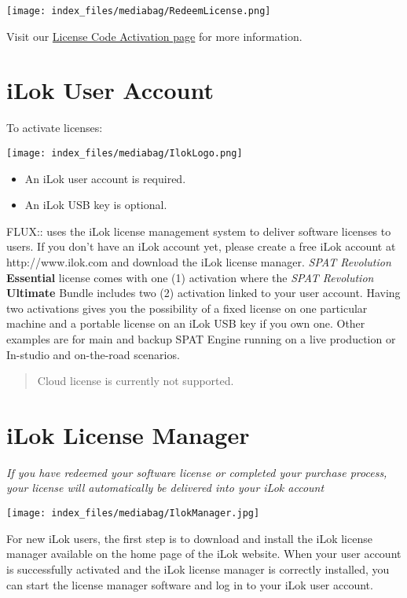 \documentclass[
  letterpaper,
  DIV=11,
  numbers=noendperiod]{scrreport}
\providecommand{\tightlist}{%
  \setlength{\itemsep}{0pt}\setlength{\parskip}{0pt}}\usepackage{longtable,booktabs,array}
\begin{document}
\texttt{[image: index\_files/mediabag/RedeemLicense.png]}

Visit our
\href{https://shop.flux.audio/en_US/account/licence_code_redeem}{License
Code Activation page} for more information.

\hypertarget{ilok-user-account}{%
\section{iLok User Account}\label{ilok-user-account}}

To activate licenses:

\texttt{[image: index\_files/mediabag/IlokLogo.png]}

\begin{itemize}
\tightlist
\item
  An iLok user account is required.
\item
  An iLok USB key is optional.
\end{itemize}

FLUX:: uses the iLok license management system to deliver software
licenses to users. If you don't have an iLok account yet, please create
a free iLok account at http://www.ilok.com and download the iLok license
manager. \emph{SPAT Revolution} \textbf{Essential} license comes with
one (1) activation where the \emph{SPAT Revolution} \textbf{Ultimate}
Bundle includes two (2) activation linked to your user account. Having
two activations gives you the possibility of a fixed license on one
particular machine and a portable license on an iLok USB key if you own
one. Other examples are for main and backup SPAT Engine running on a
live production or In-studio and on-the-road scenarios.

\begin{quote}
Cloud license is currently not supported.
\end{quote}

\hypertarget{ilok-license-manager}{%
\section{iLok License Manager}\label{ilok-license-manager}}

\emph{If you have redeemed your software license or completed your
purchase process, your license will automatically be delivered into your
iLok account}

\texttt{[image: index\_files/mediabag/IlokManager.jpg]}

For new iLok users, the first step is to download and install the iLok
license manager available on the home page of the iLok website. When
your user account is successfully activated and the iLok license manager
is correctly installed, you can start the license manager software and
log in to your iLok user account.
\end{document}
